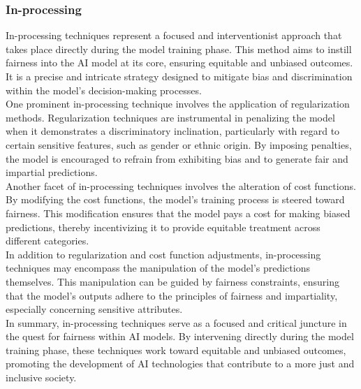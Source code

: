 \documentclass[12pt,a4paper,openright,twoside]{book}
\begin{document}
\subsubsection{In-processing}
In-processing techniques represent a focused and interventionist approach that takes place directly during the model training phase. This method aims to instill fairness into the AI model at its core, ensuring equitable and unbiased outcomes. It is a precise and intricate strategy designed to mitigate bias and discrimination within the model's decision-making processes. \\
One prominent in-processing technique involves the application of regularization methods. Regularization techniques are instrumental in penalizing the model when it demonstrates a discriminatory inclination, particularly with regard to certain sensitive features, such as gender or ethnic origin. By imposing penalties, the model is encouraged to refrain from exhibiting bias and to generate fair and impartial predictions. \\
Another facet of in-processing techniques involves the alteration of cost functions. By modifying the cost functions, the model's training process is steered toward fairness. This modification ensures that the model pays a cost for making biased predictions, thereby incentivizing it to provide equitable treatment across different categories. \\
In addition to regularization and cost function adjustments, in-processing techniques may encompass the manipulation of the model's predictions themselves. This manipulation can be guided by fairness constraints, ensuring that the model's outputs adhere to the principles of fairness and impartiality, especially concerning sensitive attributes. \\
In summary, in-processing techniques serve as a focused and critical juncture in the quest for fairness within AI models. By intervening directly during the model training phase, these techniques work toward equitable and unbiased outcomes, promoting the development of AI technologies that contribute to a more just and inclusive society.
\end{document}
